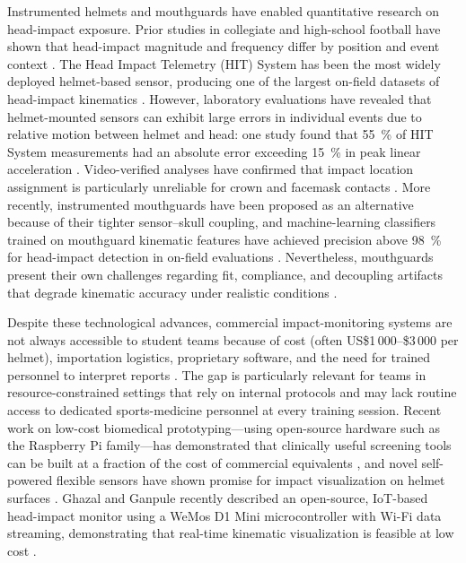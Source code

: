 \documentclass[11pt]{article}
\begin{document}
Instrumented helmets and mouthguards have enabled quantitative research on head-impact exposure. Prior studies in collegiate and high-school football have shown that head-impact magnitude and frequency differ by position and event context \citep{guskiewicz2007measurement,broglio2009headimpacts,campbell2014quantifying,crisco2010frequency}. The Head Impact Telemetry (HIT) System has been the most widely deployed helmet-based sensor, producing one of the largest on-field datasets of head-impact kinematics \citep{king2017systematic}. However, laboratory evaluations have revealed that helmet-mounted sensors can exhibit large errors in individual events due to relative motion between helmet and head: one study found that \SI{55}{\percent} of HIT System measurements had an absolute error exceeding \SI{15}{\percent} in peak linear acceleration \citep{jadischke2013accuracy}. Video-verified analyses have confirmed that impact location assignment is particularly unreliable for crown and facemask contacts \citep{beckwith2020video}. More recently, instrumented mouthguards have been proposed as an alternative because of their tighter sensor--skull coupling, and machine-learning classifiers trained on mouthguard kinematic features have achieved precision above \SI{98}{\percent} for head-impact detection in on-field evaluations \citep{gabler2020onfield}. Nevertheless, mouthguards present their own challenges regarding fit, compliance, and decoupling artifacts that degrade kinematic accuracy under realistic conditions \citep{liu2020validation,campolettano2020onfield,decker2024decoupling}.

Despite these technological advances, commercial impact-monitoring systems are not always accessible to student teams because of cost (often US\$1\,000--\$3\,000 per helmet), importation logistics, proprietary software, and the need for trained personnel to interpret reports \citep{king2017systematic}. The gap is particularly relevant for teams in resource-constrained settings that rely on internal protocols and may lack routine access to dedicated sports-medicine personnel at every training session. Recent work on low-cost biomedical prototyping---using open-source hardware such as the Raspberry Pi family---has demonstrated that clinically useful screening tools can be built at a fraction of the cost of commercial equivalents \citep{madona2024multisensory}, and novel self-powered flexible sensors have shown promise for impact visualization on helmet surfaces \citep{wu2023wireless}. Ghazal and Ganpule recently described an open-source, IoT-based head-impact monitor using a WeMos D1 Mini microcontroller with Wi-Fi data streaming, demonstrating that real-time kinematic visualization is feasible at low cost \citep{ghazal2025opensource}.
\end{document}
